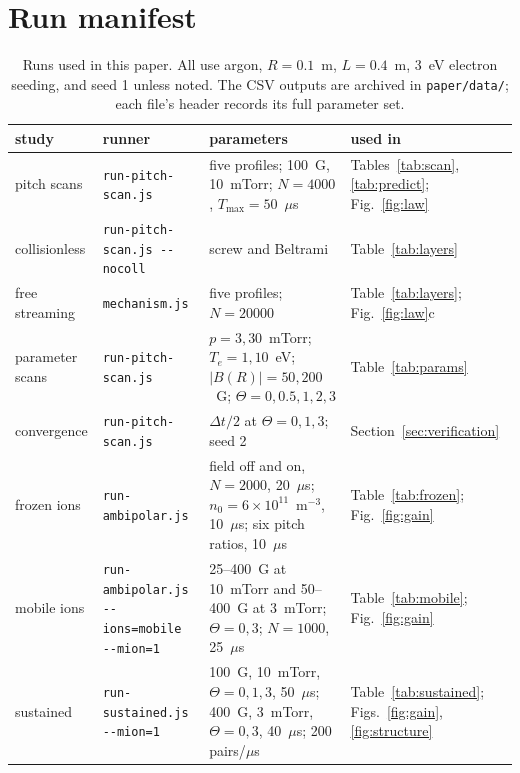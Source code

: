 \documentclass[11pt]{article}
\newcommand{\us}{\ensuremath{\mu}s}
\begin{document}
\appendix

\section{Run manifest}
\label{sec:manifest}

\begin{table}[htbp]
\centering
\small
\caption{Runs used in this paper. All use argon, $R = 0.1$~m, $L = 0.4$~m, 3~eV electron seeding, and seed 1 unless noted. The CSV outputs are archived in \texttt{paper/data/}; each file's header records its full parameter set.}
\label{tab:manifest}
\begin{tabular}{>{\raggedright}p{2.6cm}>{\raggedright}p{4.3cm}>{\raggedright}p{5.6cm}>{\raggedright\arraybackslash}p{2.2cm}}
\toprule
study & runner & parameters & used in \\
\midrule
pitch scans & \texttt{run-pitch-scan.js} & five profiles; 100~G, 10~mTorr; $N = 4000$, $T_{\max} = 50$~\us & Tables~\ref{tab:scan}, \ref{tab:predict}; Fig.~\ref{fig:law} \\
collisionless & \texttt{run-pitch-scan.js -{}-nocoll} & screw and Beltrami & Table~\ref{tab:layers} \\
free streaming & \texttt{mechanism.js} & five profiles; $N = 20000$ & Table~\ref{tab:layers}; Fig.~\ref{fig:law}c \\
parameter scans & \texttt{run-pitch-scan.js} & $p = 3, 30$~mTorr; $T_e = 1, 10$~eV; $|B(R)| = 50, 200$~G; $\Theta = 0, 0.5, 1, 2, 3$ & Table~\ref{tab:params} \\
convergence & \texttt{run-pitch-scan.js} & $\Delta t/2$ at $\Theta = 0, 1, 3$; seed 2 & Section~\ref{sec:verification} \\
frozen ions & \texttt{run-ambipolar.js} & field off and on, $N = 2000$, 20~\us; $n_0 = 6\times10^{11}$~m$^{-3}$, 10~\us; six pitch ratios, 10~\us & Table~\ref{tab:frozen}; Fig.~\ref{fig:gain} \\
mobile ions & \texttt{run-ambipolar.js -{}-ions=mobile -{}-mion=1} & 25--400~G at 10~mTorr and 50--400~G at 3~mTorr; $\Theta = 0, 3$; $N = 1000$, 25~\us & Table~\ref{tab:mobile}; Fig.~\ref{fig:gain} \\
sustained & \texttt{run-sustained.js -{}-mion=1} & 100~G, 10~mTorr, $\Theta = 0, 1, 3$, 50~\us; 400~G, 3~mTorr, $\Theta = 0, 3$, 40~\us; 200 pairs/\us & Table~\ref{tab:sustained}; Figs.~\ref{fig:gain}, \ref{fig:structure} \\
\bottomrule
\end{tabular}
\end{table}
\end{document}
